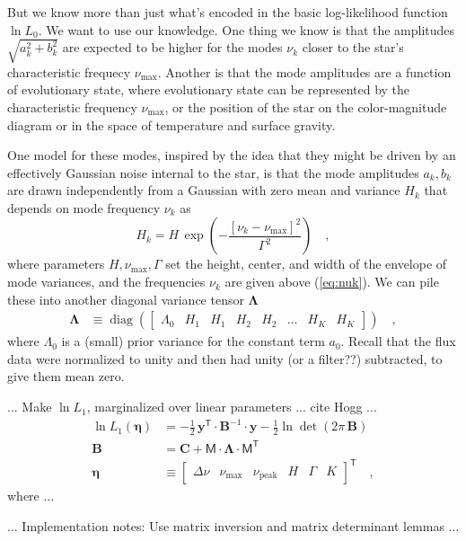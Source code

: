 \documentclass[modern]{aastex63}
\newcommand{\nupeak}{\nu_\mathrm{peak}}
\newcommand{\numax}{\nu_\mathrm{max}}
\newcommand{\T}{^{\!\mathsf{T}\!}}
\newcommand{\inv}{^{-1}}
\renewcommand{\vector}[1]{\boldsymbol{#1}}
\newcommand{\vy}{\vector{y}}
\newcommand{\veta}{\vector{\eta}}
\renewcommand{\tensor}[1]{\mathbf{#1}}
\newcommand{\tB}{\tensor{B}}
\newcommand{\tC}{\tensor{C}}
\DeclareMathOperator{\diag}{diag}
\newcommand{\tLambda}{\tensor{\Lambda}}
\newcommand{\mat}[1]{\mathsf{#1}}
\newcommand{\mM}{\mat{M}}
\begin{document}
But we know more than just what's encoded in the basic log-likelihood function $\ln L_0$.
We want to use our knowledge.
One thing we know is that the amplitudes $\sqrt{a_k^2+b_k^2}$
are expected to be higher for the
modes $\nu_k$ closer to the star's characteristic frequecy $\numax$.
Another is that the mode amplitudes are a function of evolutionary
state, where evolutionary state can be represented by the characteristic
frequency $\numax$, or the position of
the star on the color-magnitude diagram or in the space of temperature
and surface gravity.

One model for these modes, inspired by the idea that they might be driven
by an effectively Gaussian noise internal to the star, is that the mode
amplitudes $a_k, b_k$ are drawn independently from a Gaussian with zero
mean and variance $H_k$ that depends on mode frequency $\nu_k$ as
\begin{equation}\label{eq:bell}
  H_k = H\,\exp(- \frac{[\nu_k - \numax]^2}{\Gamma^2})
  \quad ,
\end{equation}
where parameters $H, \numax, \Gamma$ set the height, center, and width of
the envelope of mode variances, and the frequencies $\nu_k$ are given
above (\ref{eq:nuk}).
We can pile these into another diagonal variance tensor $\tLambda$
\begin{align}
  \tLambda &\equiv \diag(\begin{bmatrix} \Lambda_0 & H_1 & H_1 & H_2 & H_2 & \hdots & H_K & H_K \end{bmatrix})
  \quad ,
\end{align}
where $\Lambda_0$ is a (small) prior variance for the constant term $a_0$.
Recall that the flux data were normalized to unity and then had unity
(or a filter??) subtracted, to give them mean zero.

... Make $\ln L_1$, marginalized over linear parameters ... cite Hogg ...
\begin{align}
  \ln L_1(\veta) &= -\frac{1}{2}\,\vy\T\cdot\tB\inv\cdot\vy - \frac{1}{2}\ln\det(2\pi\,\tB)
  \\
  \tB &= \tC + \mM\cdot\tLambda\cdot\mM\T
  \\
  \veta &\equiv \begin{bmatrix} \Delta\nu & \numax & \nupeak & H & \Gamma & K \end{bmatrix}\T
  \quad ,
\end{align}
where ...

... Implementation notes: Use matrix inversion and matrix determinant lemmas ...
\end{document}
